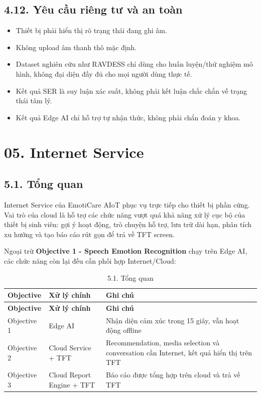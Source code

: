 \documentclass[12pt,a4paper]{article}
\begin{document}
\subsection*{4.12. Yêu cầu riêng tư và an toàn}

\begin{itemize}
\item Thiết bị phải hiển thị rõ trạng thái đang ghi âm.
\item Không upload âm thanh thô mặc định.
\item Dataset nghiên cứu như RAVDESS chỉ dùng cho huấn luyện/thử nghiệm mô hình, không đại diện đầy đủ cho mọi người dùng thực tế.
\item Kết quả SER là suy luận xác suất, không phải kết luận chắc chắn về trạng thái tâm lý.
\item Kết quả Edge AI chỉ hỗ trợ tự nhận thức, không phải chẩn đoán y khoa.
\end{itemize}

\FloatBarrier

\clearpage
\section*{05. Internet Service}

\subsection*{5.1. Tổng quan}

Internet Service của EmotiCare AIoT phục vụ trực tiếp cho thiết bị phần cứng. Vai trò của cloud là hỗ trợ các chức năng vượt quá khả năng xử lý cục bộ của thiết bị sinh viên: gợi ý hoạt động, trò chuyện hỗ trợ, lưu trữ dài hạn, phân tích xu hướng và tạo báo cáo rút gọn để trả về TFT screen.


Ngoại trừ \textbf{Objective 1 - Speech Emotion Recognition} chạy trên Edge AI, các chức năng còn lại đều cần phối hợp Internet/Cloud:


\begin{center}
\begin{longtable}{|P{0.25\textwidth}|P{0.32\textwidth}|P{0.33\textwidth}|}
\caption{5.1. Tổng quan}\\
\hline
\textbf{Objective} & \textbf{Xử lý chính} & \textbf{Ghi chú} \\
\hline
\endfirsthead
\hline
\textbf{Objective} & \textbf{Xử lý chính} & \textbf{Ghi chú} \\
\hline
\endhead
Objective 1 & Edge AI & Nhận diện cảm xúc trong 15 giây, vẫn hoạt động offline \\
\hline
Objective 2 & Cloud Service + TFT & Recommendation, media selection và conversation cần Internet, kết quả hiển thị trên TFT \\
\hline
Objective 3 & Cloud Report Engine + TFT & Báo cáo được tổng hợp trên cloud và trả về TFT \\
\hline
\end{longtable}
\end{center}
\end{document}
